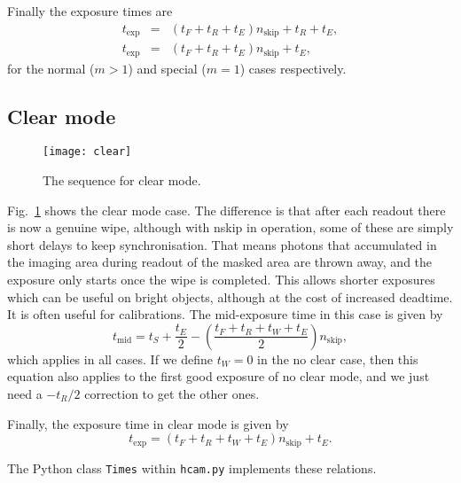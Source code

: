 \documentclass[12pt,a4paper]{article}
\begin{document}
Finally the exposure times are
\begin{eqnarray}
t_{\mathrm{exp}} &=& (t_F + t_R + t_E) n_{\mathrm{skip}} + t_R + t_E,\\
t_{\mathrm{exp}} &=& (t_F + t_R + t_E) n_{\mathrm{skip}} + t_E,
\end{eqnarray}
for the normal ($m > 1$) and special ($m = 1$) cases respectively.

\subsection{Clear mode}

\begin{figure}
\begin{center}
\texttt{[image: clear]}
\end{center}
\caption{\label{clear} The sequence for clear mode.}
\end{figure}

Fig.~\ref{clear} shows the clear mode case. The difference is that after each
readout there is now a genuine wipe, although with nskip in operation, some of
these are simply short delays to keep synchronisation. That means photons that
accumulated in the imaging area during readout of the masked area are thrown
away, and the exposure only starts once the wipe is completed. This allows
shorter exposures which can be useful on bright objects, although at the cost
of increased deadtime. It is often useful for calibrations. The mid-exposure 
time in this case is given by
\begin{equation}
t_{\mathrm{mid}} = t_S + \frac{t_E}{2} -
\left(\frac{t_F + t_R + t_W + t_E}{2}\right) n_{\mathrm{skip}} ,
\end{equation}
which applies in all cases.
If we define $t_W = 0$ in the no clear case, then this equation also applies
to the first good exposure of no clear mode, and we just need a $-t_R/2$
correction to get the other ones.

Finally, the exposure time in clear mode is given by
\begin{equation}
 t_{\mathrm{exp}} = (t_F + t_R + t_W + t_E) n_{\mathrm{skip}} + t_E.
\end{equation}

The Python class {\tt Times} within {\tt hcam.py} implements these relations.
\end{document}
